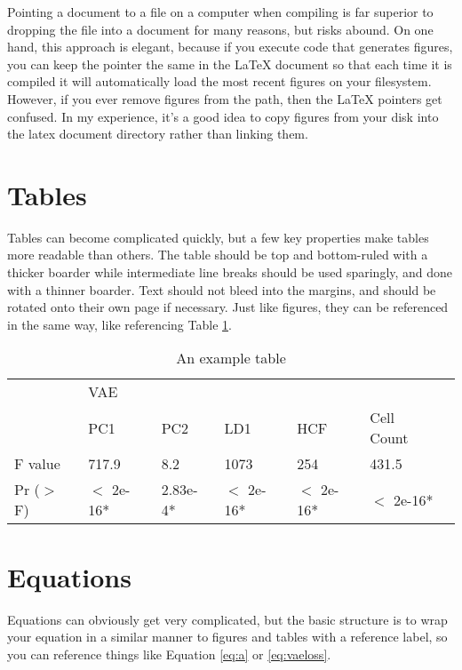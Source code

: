 Pointing a document to a file on a computer when compiling is far superior to dropping the file into a document for many reasons, but risks abound. 
On one hand, this approach is elegant, because if you execute code that generates figures, you can keep the pointer the same in the LaTeX document so that each time it is compiled it will automatically load the most recent figures on your filesystem.
However, if you ever remove figures from the path, then the LaTeX pointers get confused. 
In my experience, it's a good idea to copy figures from your disk into the latex document directory rather than linking them.

\section{Tables}

Tables can become complicated quickly, but a few key properties make tables more readable than others.
The table should be top and bottom-ruled with a thicker boarder while intermediate line breaks should be used sparingly, and done with a thinner boarder.
Text should not bleed into the margins, and should be rotated onto their own page if necessary.
Just like figures, they can be referenced in the same way, like referencing Table \ref{tab:example_table}.


\begin{table}[b]
  \caption{An example table}
  \label{tab:example_table}
  \centering
  \begin{tabular}{lllllll}
    \toprule
    & \multicolumn{3}{l}{VAE} & &\\
	\cmidrule(r){2-4}
                & PC1 	        & PC2    	& LD1 		    & HCF       & Cell Count\\
    \midrule
    F value 	& 717.9		    & 8.2        &    1073 	    & 254       & 431.5 \\
    Pr ($>$ F)	&  $<$ 2e-16*    & 2.83e-4*   & $<$ 2e-16*  	& $<$ 2e-16* & $<$ 2e-16* \\
    \bottomrule
  \end{tabular}
\end{table}


\section{Equations}

Equations can obviously get very complicated, but the basic structure is to wrap your equation in a similar manner to figures and tables with a reference label, so you can reference things like Equation \ref{eq:a} or \ref{eq:vaeloss}.

